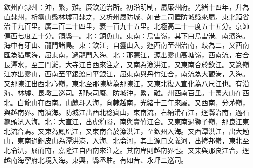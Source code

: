 \begin{pinyinscope}
欽州直隸州：沖，繁，難。廉欽道治所。初沿明制，屬廉州府。光緒十四年，升為直隸州，析靈山縣林墟司隸之，又析州屬防城、如昔二司置防城縣來屬。東北距省治千九百里。廣二百二十四里，袤一百九十五里。北極高二十一度五十五分。京師偏西七度五十分。領縣一。北：銅魚山。東南：烏雷嶺，其下曰烏雷港。南濱海。海中有牙山、龍門諸島。東：欽江，自靈山入，迤西南至州治南，歧為二，又西南匯為貓尾海，屈東南，過龍門入海。北：那蒙江，源出靈山高塘嶺，西南流，右合長潭水，至三門灘，大寺江自西來注之，又南為漁洪江，又東南合於欽江。又篆嶺江亦出靈山，西南至平銀渡曰平銀江，屈東南與丹竹江合，南流為大觀港，入海。又那陳江出西北心嶺，東北至那陳墟為那陳江，又東北復入宣化為八尺江也。有沿海、林墟、長墩三巡司。那陳司廢。防城沖，繁，難。州西南百里。十萬大山在西北。白龍山在西南。山麓斗入海，向隸越南，光緒十三年來屬。又西南，分茅嶺，與越南界。南濱海。防城江出西北稔賓山，東南流，右納滑石江，逕縣治南，過石龜頭汛入海。北：大直江，出虎豹隘，南與賣竹江合。又東南過獅子嶺，那良江東北流合焉。又東為鳳凰江，又東南合於漁洪江，至欽州入海。又西潭洪江，出大勉山，東南過銅皮山為潭洪港，入海。北侖河，其上源曰文義河，出拷邦嶺，東北至北侖汛，屈而南，嘉隆江自西南來注之。其南岸則越南界也。又東與那良江合，逕越南海寧府北境入海。東興，縣丞駐。有如昔、永坪二巡司。


\end{pinyinscope}

